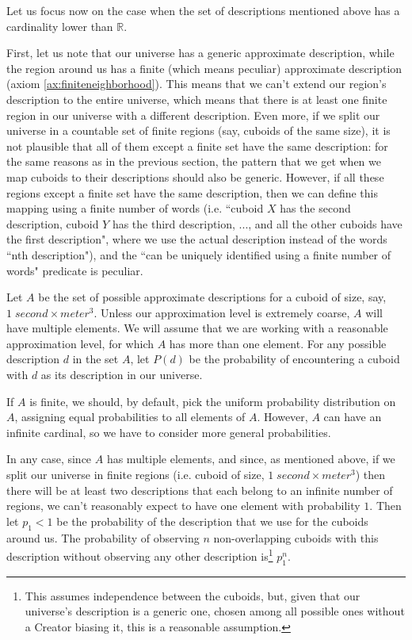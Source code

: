 \documentclass[a4paper
,draft
]{article}
\def\reale{\mathbb{R}}
\newcommand{\ghilimele}[1]{``#1"}
\begin{document}
Let us focus now on the case when the set of descriptions mentioned above
has a cardinality lower than $\reale$.

First, let us note that our universe has a generic approximate description,
while the region around us has a finite (which means peculiar) approximate
description (axiom \ref{ax:finiteneighborhood}).
This means that we can't
extend our region's description to the entire universe, which means that
there is at least one finite region in our universe with a different
description.
Even more, if we split our universe in a countable set of finite regions
(say, cuboids of the same size),
it is not plausible that all of them except a finite set have the same
description: for the same reasons as in the previous section,
the pattern that we get when we map cuboids to their descriptions should also
be generic.
However, if all these regions except a finite set have the same
description, then we can define this mapping using a finite number of words
(i.e. \ghilimele{cuboid $X$ has the second description,
cuboid $Y$ has the third description, ..., and all the other cuboids have the
first description}, where we use the actual description instead of the words
\ghilimele{nth description}),
and the \ghilimele{can be uniquely identified using a
finite number of words} predicate is peculiar.

Let $A$ be the set of possible approximate descriptions for
a cuboid of size, say, $1\;second \times meter^3$.
Unless our approximation level is extremely coarse,
$A$ will have multiple elements.
We will assume that we are working with a reasonable approximation level,
for which $A$ has more than one element.
For any possible description $d$ in the set $A$,
let $P(d)$ be the probability of encountering
a cuboid with $d$ as its description in our universe.

If $A$ is finite, we should, by default, pick the uniform probability
distribution on $A$, assigning equal probabilities to all elements of $A$.
However, $A$ can have an infinite cardinal,
so we have to consider more general probabilities.

In any case, since $A$ has multiple elements, and since, as mentioned above,
if we split our universe in finite regions
(i.e. cuboid of size, $1\;second \times meter^3$) then there will be
at least two descriptions that each belong to an infinite number of regions,
we can't reasonably expect to have one element with probability $1$.
Then let $p_1<1$ be the probability of the description that we use for the
cuboids around us.
The probability of observing $n$
non-overlapping cuboids
with this description without observing any other description is\footnote{
  This assumes independence between the cuboids, but, given that our
  universe's description is a generic one, chosen among all possible
  ones without a Creator biasing it, this is a reasonable assumption.
}
$p_1^n$.
\end{document}
